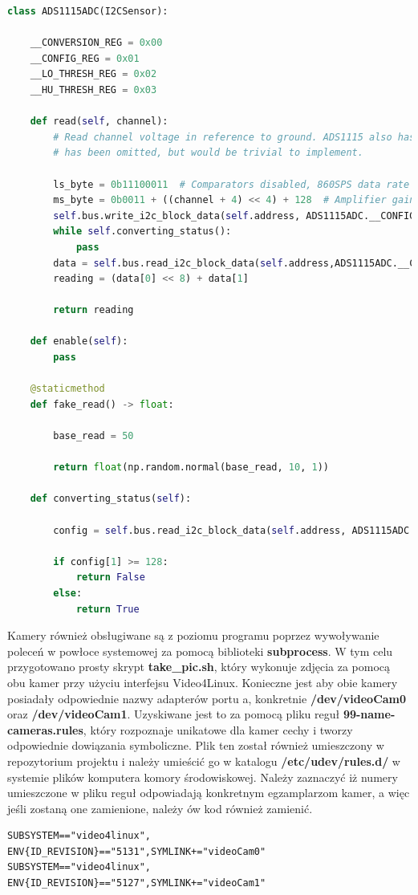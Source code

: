 \begin{lstlisting}[language=Python, caption={Przykładowa klasa czujnika.}]
class ADS1115ADC(I2CSensor):
	
	__CONVERSION_REG = 0x00
	__CONFIG_REG = 0x01
	__LO_THRESH_REG = 0x02
	__HU_THRESH_REG = 0x03
	
	def read(self, channel):
		# Read channel voltage in reference to ground. ADS1115 also has a differential measuring mode, which
		# has been omitted, but would be trivial to implement.
		
		ls_byte = 0b11100011  # Comparators disabled, 860SPS data rate
		ms_byte = 0b0011 + ((channel + 4) << 4) + 128  # Amplifier gain set to 1, start single conversion, pick channel.
		self.bus.write_i2c_block_data(self.address, ADS1115ADC.__CONFIG_REG, [ms_byte, ls_byte])
		while self.converting_status():
			pass
		data = self.bus.read_i2c_block_data(self.address,ADS1115ADC.__CONVERSION_REG,2)
		reading = (data[0] << 8) + data[1]
		
		return reading
	
	def enable(self):
		pass
	
	@staticmethod
	def fake_read() -> float:
	
		base_read = 50
		
		return float(np.random.normal(base_read, 10, 1))
	
	def converting_status(self):
	
		config = self.bus.read_i2c_block_data(self.address, ADS1115ADC.__CONFIG_REG, 2)
		
		if config[1] >= 128:
			return False
		else:
			return True
\end{lstlisting}

Kamery również obsługiwane są z poziomu programu poprzez wywoływanie poleceń w powłoce systemowej za pomocą biblioteki \textbf{subprocess}. W tym celu przygotowano prosty skrypt \textbf{take\_pic.sh}, który wykonuje zdjęcia za pomocą obu kamer przy użyciu interfejsu Video4Linux. Konieczne jest aby obie kamery posiadały odpowiednie nazwy adapterów portu a, konkretnie \textbf{/dev/videoCam0} oraz \textbf{/dev/videoCam1}. Uzyskiwane jest to za pomocą pliku reguł \textbf{99-name-cameras.rules}, który rozpoznaje unikatowe dla kamer cechy i tworzy odpowiednie dowiązania symboliczne. Plik ten został również umieszczony w repozytorium projektu i należy umieścić go w katalogu \textbf{/etc/udev/rules.d/} w systemie plików komputera komory środowiskowej. Należy zaznaczyć iż numery umieszczone w pliku reguł odpowiadają konkretnym egzamplarzom kamer, a więc jeśli zostaną one zamienione, należy ów kod również zamienić.
\begin{lstlisting}[caption={Plik reguł \textbf{99-name-cameras.rules}.}]
SUBSYSTEM=="video4linux", ENV{ID_REVISION}=="5131",SYMLINK+="videoCam0"
SUBSYSTEM=="video4linux", ENV{ID_REVISION}=="5127",SYMLINK+="videoCam1"
\end{lstlisting}

